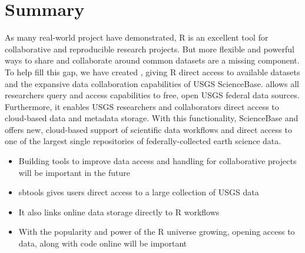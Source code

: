 \section{Summary}

As many real-world project have demonstrated, R is 
an excellent tool for collaborative and reproducible 
research projects. But more flexible and powerful
ways to share and collaborate around common datasets
are a missing component. To help fill this gap, we 
have created , giving R direct access to 
available datasets and the expansive data collaboration 
capabilities of USGS ScienceBase.  
allows all researchers query and access capabilities 
to free, open USGS federal data sources. Furthermore, 
it enables USGS researchers and collaborators direct 
access to cloud-based data and metadata storage. With 
this functionality, ScienceBase and  offers
new, cloud-based support of scientific data workflows and 
direct access to one of the largest single repositories 
of federally-collected earth science data.



\begin{itemize}
	\item{Building tools to improve data access and handling for collaborative projects will be important in the future}
	\item{sbtools gives users direct access to a large collection of USGS data}
	\item{It also links online data storage directly to R workflows}
	\item{With the popularity and power of the R universe growing, opening access to data, along with code online will be important}
\end{itemize}